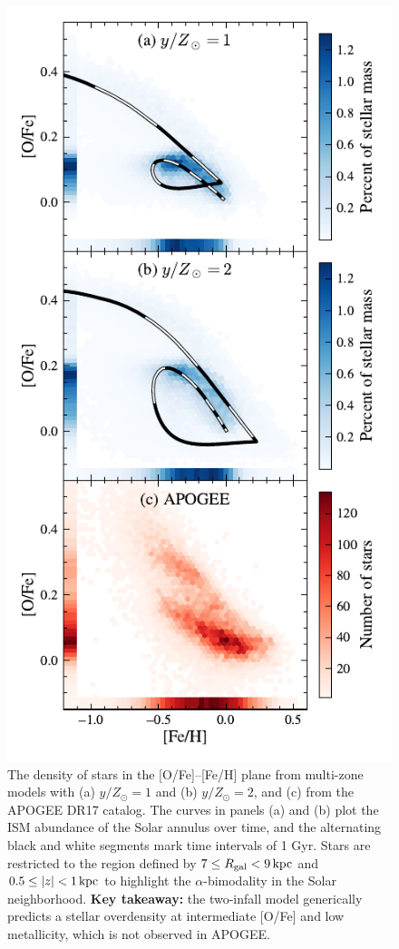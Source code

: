 \documentclass[twocolumn,twocolappendix,linenumbers]{aastex631}
\newcommand{\kpc}{\,{\rm kpc}}
\begin{document}
\begin{figure}
    \centering
    \includegraphics{figures/ofe_feh_density.pdf}
    \caption{The density of stars in the [O/Fe]--[Fe/H] plane from multi-zone models with (a) $y/Z_\odot=1$ and (b) $y/Z_\odot=2$, and (c) from the APOGEE DR17 catalog. The curves in panels (a) and (b) plot the ISM abundance of the Solar annulus over time, and the alternating black and white segments mark time intervals of {1 Gyr}. Stars are restricted to the region defined by $7\leq R_{\rm gal}< 9\kpc$ and $0.5\leq|z|<1\kpc$ to highlight the $\alpha$-bimodality in the Solar neighborhood. {\bf Key takeaway:} the two-infall model generically predicts a stellar overdensity at intermediate [O/Fe] and low metallicity, which is not observed in APOGEE.}
    \label{fig:ofe-feh-density}
\end{figure}
\end{document}
